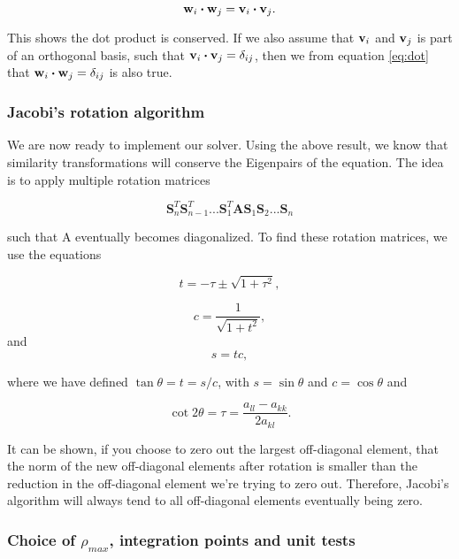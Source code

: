 \documentclass{emulateapj}
\begin{document}
\begin{equation} \label{eq:dot}
	\bold{w}_i \boldsymbol{\cdot} \bold{w}_j = \bold{v}_i \boldsymbol{\cdot} \bold{v}_j.
\end{equation}


This shows the dot product is conserved. If we also assume that $\bold{v}_i$ and $\bold{v}_j$ is part of an orthogonal basis, such that $\bold{v}_i \boldsymbol{\cdot} \bold{v}_j = \delta_{ij}$, then we from equation \ref{eq:dot} that $\bold{w}_i \boldsymbol{\cdot} \bold{w}_j = \delta_{ij}$ is also true.

\subsubsection{Jacobi's rotation algorithm}
We are now ready to implement our solver. Using the above result, we know that similarity transformations will conserve the Eigenpairs of the equation. The idea is to apply multiple rotation matrices

\[\mathbf{S}_n^T\mathbf{S}_{n-1}^T...\mathbf{S}_1^T\mathbf{A}\mathbf{S}_1\mathbf{S}_2...\mathbf{S}_n\]

such that A eventually becomes diagonalized. To find these rotation matrices, we use the equations

\begin{equation}
  t = -\tau \pm \sqrt{1+\tau^2},
\end{equation}

\begin{equation}
   c = \frac{1}{\sqrt{1+t^2}},
\end{equation}
and
\begin{equation}
    s = tc,
\end{equation}

where we have defined $\tan\theta = t= s/c$, with $s=\sin\theta$ and $c=\cos\theta$ and

\begin{equation*}
    \cot 2\theta=\tau = \frac{a_{ll}-a_{kk}}{2a_{kl}}.
\end{equation*}

It can be shown, if you choose to zero out the largest off-diagonal element, that the norm of the new off-diagonal elements after rotation is smaller than the reduction in the off-diagonal element we're trying to zero out. Therefore, Jacobi's algorithm will always tend to all off-diagonal elements eventually being zero.

\subsubsection{Choice of $\rho_{max}$, integration points and unit tests}
\end{document}
